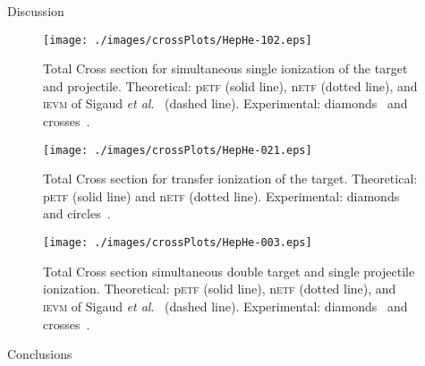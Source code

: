 \documentclass[aps, pra, reprint, groupedaddress, amsfonts,
               amsmath, amssymb, showpacs, nofootinbib]{revtex4-1}
\begin{document}
\begin{section}{Discussion \label{sec:disc}}
   \begin{figure}[htp]
      \centering
      \texttt{[image: ./images/crossPlots/HepHe-102.eps]}
      \caption{Total Cross section for simultaneous single ionization of the target and projectile.
               Theoretical: p\textsc{etf} (solid line), n\textsc{etf} (dotted line), and
                            \textsc{ievm} of Sigaud \textit{et al}.~\cite{SM-03} (dashed line).
               Experimental: diamonds~\cite{Dub-89} and crosses~\cite{SSMSM-11}. \label{fig:cs102}}
   \end{figure}

   \begin{figure}[htp]
      \centering
      \texttt{[image: ./images/crossPlots/HepHe-021.eps]}
      \caption{Total Cross section for transfer ionization of the target.
               Theoretical: p\textsc{etf} (solid line) and n\textsc{etf} (dotted line).
               Experimental: diamonds~\cite{Dub-89} and circles~\cite{FTFHLP-95}. \label{fig:cs021}}
   \end{figure}

   \begin{figure}[htp]
      \centering
      \texttt{[image: ./images/crossPlots/HepHe-003.eps]}
      \caption{Total Cross section simultaneous double target and single projectile ionization.
               Theoretical: p\textsc{etf} (solid line), n\textsc{etf} (dotted line), and
               \textsc{ievm} of Sigaud \textit{et al}.~\cite{SM-03} (dashed line).
               Experimental: diamonds~\cite{Dub-89} and crosses~\cite{SSMSM-11}. \label{fig:cs003}}
   \end{figure}

\end{section}

\begin{section}{Conclusions \label{sec:conc}}
\end{section}


\end{document}
